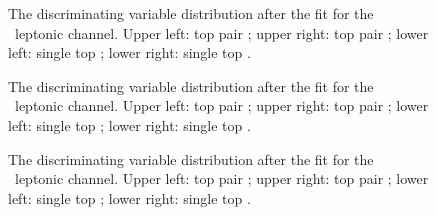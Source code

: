 \begin{figure}[h]
	\centering
	\caption{The discriminating variable distribution after the fit for the \emumu\ leptonic channel. Upper left: top pair \Zut; upper right: top pair \Zct; lower left: single top \Zut; lower right: single top \Zct.}
	\label{fig:shapesfitslepchan1e2mustcrerrortrialSTSR}
\end{figure}

\begin{figure}[h]
	\centering
	\caption{The discriminating variable distribution after the fit for the \eemu\ leptonic channel. Upper left: top pair \Zut; upper right: top pair \Zct; lower left: single top \Zut; lower right: single top \Zct.}
	\label{fig:shapesfitslepchan2e1mustcrerrortrialSTSR}
\end{figure}


\begin{figure}[h]
	\centering
	\caption{The discriminating variable distribution after the fit for the \eee\ leptonic channel. Upper left: top pair \Zut; upper right: top pair \Zct; lower left: single top \Zut; lower right: single top \Zct.}
	\label{fig:shapesfitslepchan3estcrerrortrialSTSR}
\end{figure}

